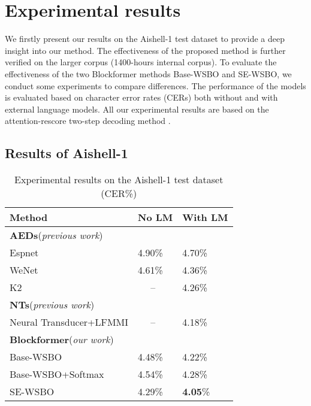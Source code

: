 \documentclass[a4paper]{article}
\begin{document}
\section{Experimental results}
We firstly present our results on the Aishell-1 test dataset to provide a deep insight into our method. The effectiveness of the proposed method is further verified on the larger corpus (1400-hours internal corpus).
To evaluate the effectiveness of the two Blockformer methods Base-WSBO and SE-WSBO, we conduct some experiments to compare differences. The performance of the models is evaluated based on character error rates (CERs) both without and with external language models. All our experimental results are based on the attention-rescore two-step decoding method \cite{Sainath2019TwoPassES, Zhang2020UnifiedSA}.


\subsection{Results of Aishell-1}
\begin{table}[t]
  \caption{Experimental results on the Aishell-1 test dataset (CER\%) }
  \label{tab:word_styles2}
  \centering
  \begin{tabular}{lll}
    \toprule
    \textbf{Method}  & \textbf{No LM}& \textbf{With LM}  \\
    \midrule
    \textbf{AEDs}(\emph{previous work}) & \\
    Espnet\cite{Watanabe2018ESPnetES}    &  4.90\%   & 4.70\%              \\
    WeNet\cite{Yao2021WeNetPO}     & 4.61\% & 4.36\%                 \\
    K2\cite{k2}        & ~~  -- &4.26\%            \\  
    \midrule
    \textbf{NTs}(\emph{previous work}) & \\
    Neural Transducer+LFMMI\cite{Tian2021ConsistentTA}  & ~~ -- &4.18\%           \\ 
    \midrule
    \textbf{Blockformer}(\emph{our work}) & \\
    Base-WSBO  & 4.48\% & 4.22\%                  \\
    Base-WSBO+Softmax  & 4.54\% & 4.28\%                  \\
    SE-WSBO     & 4.29\% & \textbf{4.05}\%                  \\
    \bottomrule
  \end{tabular}
\end{table}
\end{document}
